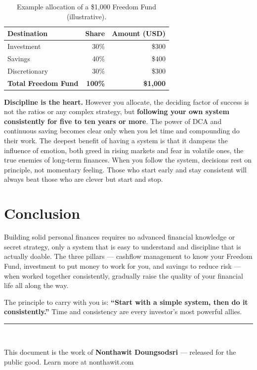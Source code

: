 \documentclass[10pt,a4paper,twocolumn]{article}
\begin{document}
\begin{table}[t]
\centering
\small
\begin{tabular}{lrr}
\toprule
\rowcolor{accent!15}
\textbf{Destination} & \textbf{Share} & \textbf{Amount (USD)} \\
\midrule
Investment   & 30\% & \$300 \\
Savings      & 40\% & \$400 \\
Discretionary & 30\% & \$300 \\
\midrule
\textbf{Total Freedom Fund} & \textbf{100\%} & \textbf{\$1{,}000} \\
\bottomrule
\end{tabular}
\caption{Example allocation of a \$1{,}000 Freedom Fund (illustrative).}
\label{tab:alloc}
\end{table}

\textbf{Discipline is the heart.} However you allocate, the deciding factor of success is not the ratios or any complex strategy, but \textbf{following your own system consistently for five to ten years or more}. The power of DCA and continuous saving becomes clear only when you let time and compounding do their work. The deepest benefit of having a system is that it dampens the influence of emotion, both greed in rising markets and fear in volatile ones, the true enemies of long-term finances. When you follow the system, decisions rest on principle, not momentary feeling. Those who start early and stay consistent will always beat those who are clever but start and stop.

\section{Conclusion}
Building solid personal finances requires no advanced financial knowledge or secret strategy, only a system that is easy to understand and discipline that is actually doable. The three pillars --- cashflow management to know your Freedom Fund, investment to put money to work for you, and savings to reduce risk --- when worked together consistently, gradually raise the quality of your financial life all along the way.

The principle to carry with you is: \textbf{``Start with a simple system, then do it consistently.''} Time and consistency are every investor's most powerful allies.

\vspace{1em}
\noindent\rule{\linewidth}{0.4pt}\\
{\small\raggedright This document is the work of \textbf{Nonthawit Doungsodsri} --- released for the public good. Learn more at nonthawit.com\par}
\end{document}
